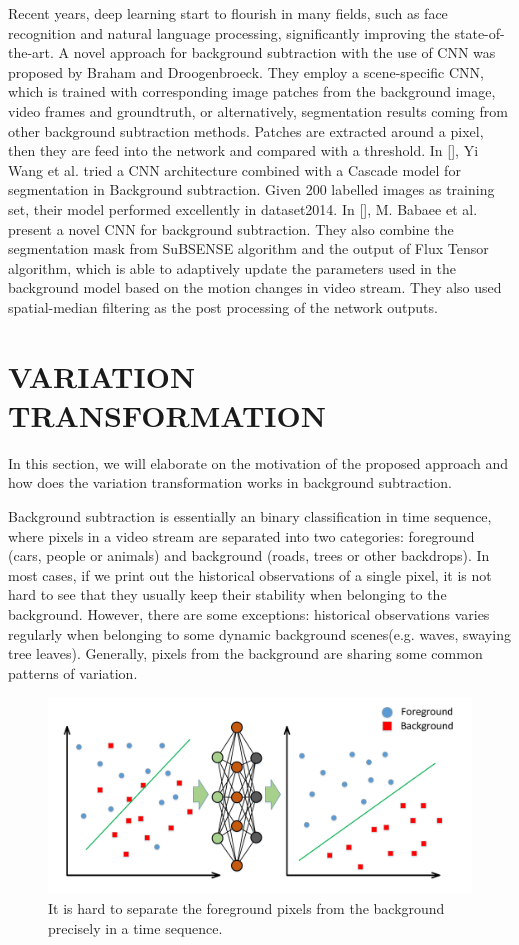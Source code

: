 \documentclass[journal]{IEEEtran}
\begin{document}
%
Recent years, deep learning start to flourish in many fields, such as face recognition and natural language processing, significantly improving the state-of-the-art. A novel approach for background subtraction with the use of CNN was proposed by Braham and Droogenbroeck. They employ a scene-specific CNN, which is trained with corresponding image patches from the background image, video frames and groundtruth, or alternatively, segmentation results coming from other background subtraction methods. Patches are extracted around a pixel, then they are feed into the network and compared with a threshold.
%
In [], Yi Wang et al. tried a CNN architecture combined with a Cascade model for segmentation in Background subtraction. Given 200 labelled images as training set, their model performed excellently in dataset2014.
%
In [], M. Babaee et al. present a novel CNN for background subtraction. They also combine the segmentation mask from SuBSENSE algorithm and the output of Flux Tensor algorithm, which is able to adaptively update the parameters used in the background model based on the motion changes in video stream. They also used spatial-median filtering as the post processing of the network outputs.
\section{VARIATION TRANSFORMATION}
In this section, we will elaborate on the motivation of the proposed approach and how does the variation transformation works in background subtraction.

Background subtraction is essentially an binary classification in time sequence, where pixels in a video stream are separated into two categories: foreground (cars, people or animals) and background (roads, trees or other backdrops). 
In most cases, if we print out the historical observations of a single pixel, it is not hard to see that they usually keep their stability when belonging to the background. 
However, there are some exceptions: historical observations varies regularly when belonging to some dynamic background scenes(e.g. 
waves, swaying tree leaves). 
Generally, pixels from the background are sharing some common patterns of variation. 


\begin{figure}[!t]	%
\centering
    \includegraphics[width=\linewidth]{figure/fig1}
    \caption{It is hard to separate the foreground pixels from the background precisely in a time sequence.}
    \label{variation_chart}
\end{figure}
\end{document}
